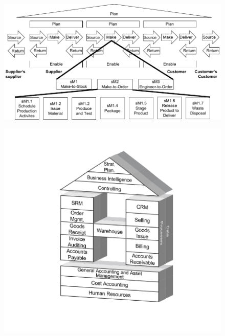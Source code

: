 \label{app:refmods}
	\begin{figure}[caption={SCOR Model}, label={fig:scor}]
	{	\includegraphics[width=.8\textwidth]{figures/scor.pdf}\\
	\parbox{.8\textwidth}{}} 
\end{figure}

	\begin{figure}[caption={Retail-H}, label={fig:retailh}]
	{	\includegraphics[width=.6\textwidth]{figures/retailh.pdf}
	\\ \parbox{0.6\textwidth}{}}

	
\end{figure}

